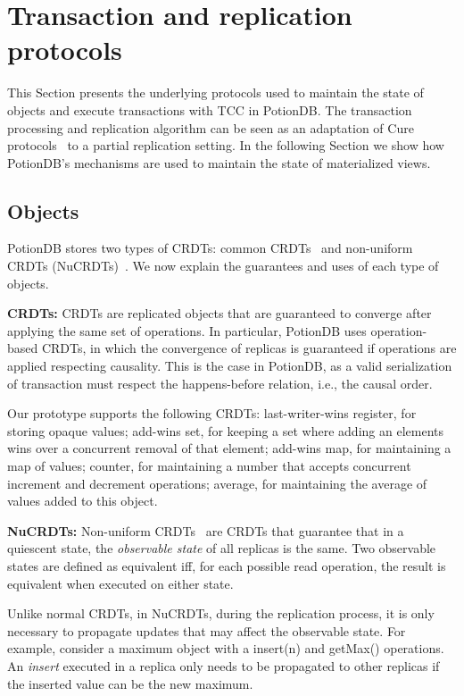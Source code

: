 \documentclass[sigplan,review,anonymous]{acmart}
\newcommand{\code}[1]{\textsf{\small{#1}}}
\begin{document}
\section{Transaction and replication protocols}
\label{sec:transactions}

This Section presents the underlying protocols used to maintain the state of objects
and execute transactions with TCC in PotionDB. The transaction processing and replication
algorithm can be seen as an adaptation of Cure protocols~\cite{cure} to a partial replication
setting. In the following Section we show how PotionDB's mechanisms are used to maintain
the state of materialized views.

\subsection{Objects}
\label{sec:tx:objs}

PotionDB stores two types of CRDTs: common CRDTs~\cite{crdt} and non-uniform CRDTs (NuCRDTs)~\cite{Cabrita17Nonuniform}.
We now explain the guarantees and uses of each type of objects.

\noindent
\textbf{CRDTs:} CRDTs are replicated objects that are guaranteed to converge
after applying the same set of operations. In particular, PotionDB uses operation-based CRDTs,
in which the convergence of replicas is guaranteed if operations are applied respecting causality. 
This is the case in PotionDB, as a valid serialization of transaction must respect the happens-before
relation, i.e., the causal order.

Our prototype supports the following CRDTs: last-writer-wins register, for storing opaque values;
add-wins set, for keeping a set where adding an elements wins over a concurrent removal of that element;
add-wins map, for maintaining a map of values;
counter, for maintaining a number that accepts concurrent increment and decrement operations;
average, for maintaining the average of values added to this object.

\noindent
\textbf{NuCRDTs:} Non-uniform CRDTs~\cite{Cabrita17Nonuniform} are CRDTs that guarantee that in a quiescent state, 
the \emph{observable state} of all replicas is the same. 
Two observable states are defined as equivalent iff, for each possible read operation, the result is equivalent when executed on either state.

Unlike normal CRDTs, in NuCRDTs, during the replication process, it is only necessary to propagate
updates that may affect the observable state. For example, consider a maximum object with a \code{insert(n)} and 
\code{getMax()} operations. An \emph{insert} executed in a replica only needs to be propagated 
to other replicas if the inserted value can be the new maximum. 
\end{document}
